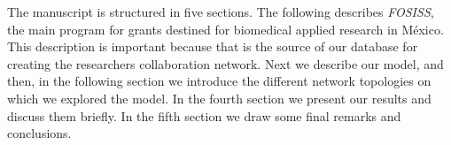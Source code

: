 \documentclass[11pt]{article}
\begin{document}
The manuscript is structured in five sections. The following describes
\textit{FOSISS}, the main program for grants destined for biomedical applied
research in M\'exico. This description is important because that is the source
of our database for creating the researchers collaboration network. Next we
describe our model, and then, in the following section we introduce the
different network topologies on which we explored the model. In the fourth
section we present  our results and discuss them briefly. In the fifth section
we draw some final remarks and conclusions.    








\end{document}
